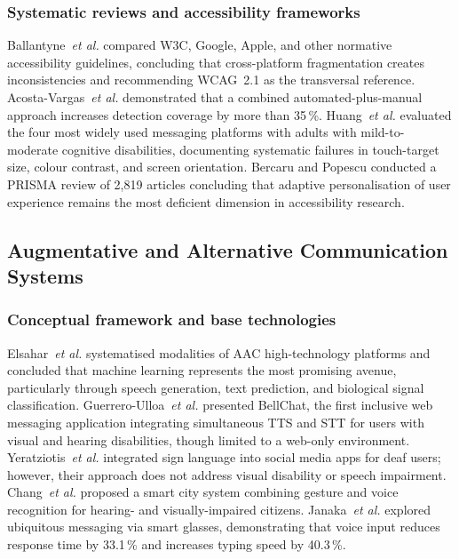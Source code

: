 \documentclass[journal]{IEEEtran}
\begin{document}
	\subsubsection{Systematic reviews and accessibility frameworks}
	Ballantyne~\textit{et al.} \cite{ballantyne2018} compared W3C,
	Google, Apple, and other normative accessibility guidelines,
	concluding that cross-platform fragmentation creates inconsistencies
	and recommending WCAG~2.1 as the transversal reference.
	Acosta-Vargas~\textit{et al.} \cite{acosta2021} demonstrated that
	a combined automated-plus-manual approach increases detection
	coverage by more than 35\,\%.
	Huang~\textit{et al.} \cite{huang2025} evaluated the four most
	widely used messaging platforms with adults with mild-to-moderate
	cognitive disabilities, documenting systematic failures in
	touch-target size, colour contrast, and screen orientation.
	Bercaru and Popescu \cite{bercaru2024} conducted a PRISMA review of
	2{,}819 articles concluding that adaptive personalisation of user
	experience remains the most deficient dimension in accessibility
	research.
	
	\subsection{Augmentative and Alternative Communication Systems}
	
	\subsubsection{Conceptual framework and base technologies}
	Elsahar~\textit{et al.} \cite{elsahar2019} systematised modalities
	of AAC high-technology platforms and concluded that machine learning
	represents the most promising avenue, particularly through speech
	generation, text prediction, and biological signal classification.
	Guerrero-Ulloa~\textit{et al.} \cite{guerrero2021bellchat}
	presented BellChat, the first inclusive web messaging application
	integrating simultaneous TTS and STT for users with visual
	and hearing disabilities, though limited to a web-only environment.
	Yeratziotis~\textit{et al.} \cite{yeratziotis2023} integrated
	sign language into social media apps for deaf users; however,
	their approach does not address visual disability or speech impairment.
	Chang~\textit{et al.} \cite{chang2022} proposed a smart city
	system combining gesture and voice recognition for hearing- and
	visually-impaired citizens.
	Janaka~\textit{et al.} \cite{janaka2023} explored ubiquitous
	messaging via smart glasses, demonstrating that voice input reduces
	response time by 33.1\,\% and increases typing speed by 40.3\,\%.
	
\end{document}
